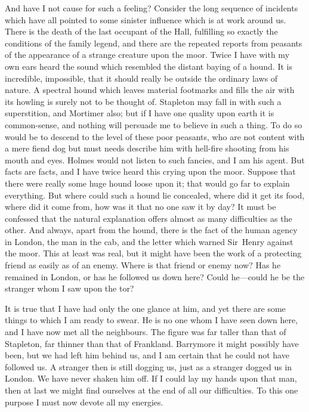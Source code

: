 And have I not cause for such a feeling? Consider the long sequence of incidents which have all pointed to some sinister influence which is at work around us. There is the death of the last occupant of the Hall, fulfilling so exactly the conditions of the family legend, and there are the repeated reports from peasants of the appearance of a strange creature upon the moor. Twice I have with my own ears heard the sound which resembled the distant baying of a hound. It is incredible, impossible, that it should really be outside the ordinary laws of nature. A spectral hound which leaves material footmarks and fills the air with its howling is surely not to be thought of. Stapleton may fall in with such a superstition, and Mortimer also; but if I have one quality upon earth it is common-sense, and nothing will persuade me to believe in such a thing. To do so would be to descend to the level of these poor peasants, who are not content with a mere fiend dog but must needs describe him with hell-fire shooting from his mouth and eyes. Holmes would not listen to such fancies, and I am his agent. But facts are facts, and I have twice heard this crying upon the moor. Suppose that there were really some huge hound loose upon it; that would go far to explain everything. But where could such a hound lie concealed, where did it get its food, where did it come from, how was it that no one saw it by day? It must be confessed that the natural explanation offers almost as many difficulties as the other. And always, apart from the hound, there is the fact of the human agency in London, the man in the cab, and the letter which warned Sir~Henry against the moor. This at least was real, but it might have been the work of a protecting friend as easily as of an enemy. Where is that friend or enemy now? Has he remained in London, or has he followed us down here? Could he—could he be the stranger whom I saw upon the tor?

It is true that I have had only the one glance at him, and yet there are some things to which I am ready to swear. He is no one whom I have seen down here, and I have now met all the neighbours. The figure was far taller than that of Stapleton, far thinner than that of Frankland. Barrymore it might possibly have been, but we had left him behind us, and I am certain that he could not have followed us. A stranger then is still dogging us, just as a stranger dogged us in London. We have never shaken him off. If I could lay my hands upon that man, then at last we might find ourselves at the end of all our difficulties. To this one purpose I must now devote all my energies.


